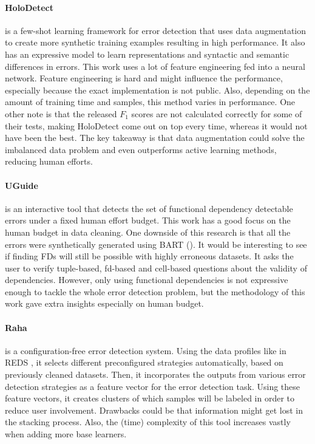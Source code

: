 \paragraph{HoloDetect \cite{Heidari2019-ox}} is a few-shot learning framework for error detection that uses data augmentation to create more synthetic training examples resulting in high performance. It also has an expressive model to learn representations and syntactic and semantic differences in errors. This work uses a lot of feature engineering fed into a neural network. Feature engineering is hard and might influence the performance, especially because the exact implementation is not public. Also, depending on the amount of training time and samples, this method varies in performance. One other note is that the released $F_1$ scores are not calculated correctly for some of their tests, making HoloDetect come out on top every time, whereas it would not have been the best. The key takeaway is that data augmentation could solve the imbalanced data problem and even outperforms active learning methods, reducing human efforts. 

\paragraph{UGuide \cite{Thirumuruganathan2017-ip}} is an interactive tool that detects the set of functional dependency detectable errors under a fixed human effort budget. This work has a good focus on the human budget in data cleaning. One downside of this research is that all the errors were synthetically generated using BART (\cite{Arocena2015-om}). It would be interesting to see if finding FDs will still be possible with highly erroneous datasets. It asks the user to verify tuple-based, fd-based and cell-based questions about the validity of dependencies. However, only using functional dependencies is not expressive enough to tackle the whole error detection problem, but the methodology of this work gave extra insights especially on human budget.


\paragraph{Raha \cite{Mahdavi2019-zf}} is a configuration-free error detection system. Using the data profiles like in REDS \cite{Mahdavi2019-pk}, it selects different preconfigured strategies automatically, based on previously cleaned datasets. Then, it incorporates the outputs from various error detection strategies as a feature vector for the error detection task. 
Using these feature vectors, it creates clusters of which samples will be labeled in order to reduce user involvement. Drawbacks could be that information might get lost in the stacking process. Also, the (time) complexity of this tool increases vastly when adding more base learners.


